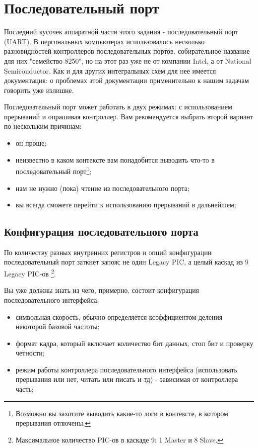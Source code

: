 \section{Последовательный порт}

Последний кусочек аппаратной части этого задания - последовательный порт (UART).
В персональных компьютерах использовалось несколько разновидностей контроллеров
последовательных портов, собирательное название для них "семейство 8250", но на
этот раз уже не от компании Intel, а от National Semiconductor. Как и для других
интегральных схем для нее имеется документация: \cite{NS:8250DS} о проблемах
этой документации применительно к нашим задачам говорить уже излишне.

Последовательный порт может работать в двух режимах: с использованием прерываний
и опрашивая контроллер. Вам рекомендуется выбрать второй вариант по нескольким
причинам:
\begin{itemize}
  \item он проще;
  \item неизвестно в каком контексте вам понадобится выводить что-то в
        последовательный порт\footnote{Возможно вы захотите выводить какие-то
        логи в контексте, в котором прерывания отлючены.};
  \item нам не нужно (пока) чтение из последовательного порта;
  \item вы всегда сможете перейти к использованию прерываний в дальнейшем;
\end{itemize}

\subsection{Конфигурация последовательного порта}

По количеству разных внутренних регистров и опций конфигурации последовательный
порт заткнет запояс не один Legacy PIC, а целый каскад из 9 Legacy PIC-ов
\footnote{Максимальное количество PIC-ов в каскаде 9: 1 Master и 8 Slave.}.

Вы уже должны знать из чего, примерно, состоит конфигурация последовательного
интерфейса:

\begin{itemize}
  \item символьная скорость, обычно определяется коэффициентом деления некоторой
        базовой частоты;
  \item формат кадра, который включает количество бит данных, стоп бит и
        проверку четности;
  \item режим работы контроллера последовательного интерфейса (использовать
        прерывания или нет, читать или писать и тд) - зависимая от контроллера
        часть;
\end{itemize}

